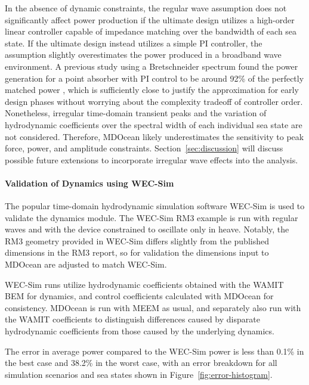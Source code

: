 In the absence of dynamic constraints, the regular wave assumption does not significantly affect power production if the ultimate design utilizes a high-order linear controller capable of impedance matching over the bandwidth of each sea state.
If the ultimate design instead utilizes a simple PI controller, the assumption slightly overestimates the power produced in a broadband wave environment.
A previous study using a Bretschneider spectrum found the power generation for a point absorber with PI control to be around 92\% of the perfectly matched power \cite{coe_practical_2021}, which is sufficiently close to justify the approximation for early design phases without worrying about the complexity tradeoff of controller order.
Nonetheless, irregular time-domain transient peaks and the variation of hydrodynamic coefficients over the spectral width of each individual sea state are not considered.
Therefore, MDOcean likely underestimates the sensitivity to peak force, power, and amplitude constraints.
Section~\ref{sec:discussion} will discuss possible future extensions to incorporate irregular wave effects into the analysis.

\paragraph{Validation of Dynamics using WEC-Sim}
The popular time-domain hydrodynamic simulation software WEC-Sim \cite{ruehl_wec-simwec-sim_2024} is used to validate the dynamics module.
The WEC-Sim RM3 example is run with regular waves and with the device constrained to oscillate only in heave.
Notably, the RM3 geometry provided in WEC-Sim differs slightly from the published dimensions in the RM3 report, so for validation the dimensions input to MDOcean are adjusted to match WEC-Sim.

WEC-Sim runs utilize hydrodynamic coefficients obtained with the WAMIT BEM for dynamics, and control coefficients calculated with MDOcean for consistency.
MDOcean is run with MEEM as usual, and separately also run with the WAMIT coefficients %
to distinguish differences caused by disparate hydrodynamic coefficients from those caused by the underlying dynamics. 

The error in average power compared to the WEC-Sim power is less than 0.1\% in the best case and 38.2\% in the worst case, with an error breakdown for all simulation scenarios and sea states shown in Figure~\ref{fig:error-histogram}. 

